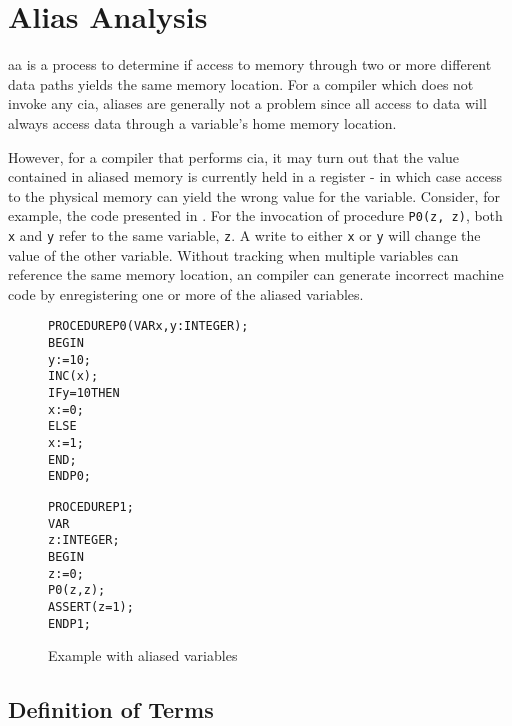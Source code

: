 \chapter{Alias Analysis}

\ac{aa} is a process to determine if access to memory through two or
more different data paths yields the same memory location.  For a
compiler which does not invoke any \ac{cia}, aliases are generally not
a problem since all access to data will always access data through a
variable's home memory location.

However, for a compiler that performs \ac{cia}, it may turn out that
the value contained in aliased memory is currently held in a register
- in which case access to the physical memory can yield the wrong
value for the variable.  Consider, for example, the code presented in
.  For the invocation of procedure
\texttt{P0(z,~z)}, both \texttt{x} and \texttt{y} refer to the same
variable, \texttt{z}.  A write to either \texttt{x} or \texttt{y} will
change the value of the other variable.  Without tracking when
multiple variables can reference the same memory location, an compiler
can generate incorrect machine code by enregistering one or more of
the aliased variables.


\begin{figure}[h]
\begin{alltt}
PROCEDURE P0(VAR x, y : INTEGER);
BEGIN
  y := 10;
  INC(x);
  IF y = 10 THEN
    x := 0;
  ELSE
    x := 1;
  END;
END P0;

PROCEDURE P1;
VAR
  z : INTEGER;
BEGIN
  z := 0;
  P0(z, z);
  ASSERT(z = 1);
END P1;
\end{alltt}
  \caption{Example with aliased variables}\label{fig:alias-example}
\end{figure}


\section{Definition of Terms}

